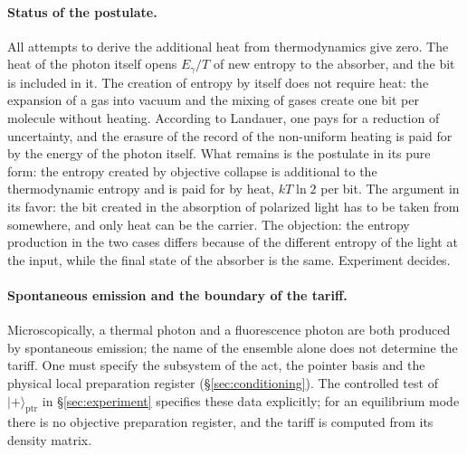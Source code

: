 \documentclass[11pt,a4paper]{article}
\newcommand{\Sref}[1]{\hyperref[#1]{\S\ref{#1}}}
\begin{document}
\paragraph{Status of the postulate.}
All attempts to derive the additional heat from thermodynamics give zero. The heat of the photon itself opens $E_\gamma/T$ of new entropy to the absorber, and the bit is included in it. The creation of entropy by itself does not require heat: the expansion of a gas into vacuum and the mixing of gases create one bit per molecule without heating. According to Landauer, one pays for a reduction of uncertainty, and the erasure of the record of the non-uniform heating is paid for by the energy of the photon itself. What remains is the postulate in its pure form: the entropy created by objective collapse is additional to the thermodynamic entropy and is paid for by heat, $kT\ln 2$ per bit. The argument in its favor: the bit created in the absorption of polarized light has to be taken from somewhere, and only heat can be the carrier. The objection: the entropy production in the two cases differs because of the different entropy of the light at the input, while the final state of the absorber is the same. Experiment decides.

\paragraph{Spontaneous emission and the boundary of the tariff.}
Microscopically, a thermal photon and a fluorescence photon are both produced by spontaneous emission; the name of the ensemble alone does not determine the tariff. One must specify the subsystem of the act, the pointer basis and the physical local preparation register (\Sref{sec:conditioning}). The controlled test of $|{+}\rangle_{\mathrm{ptr}}$ in \Sref{sec:experiment} specifies these data explicitly; for an equilibrium mode there is no objective preparation register, and the tariff is computed from its density matrix.
\end{document}
